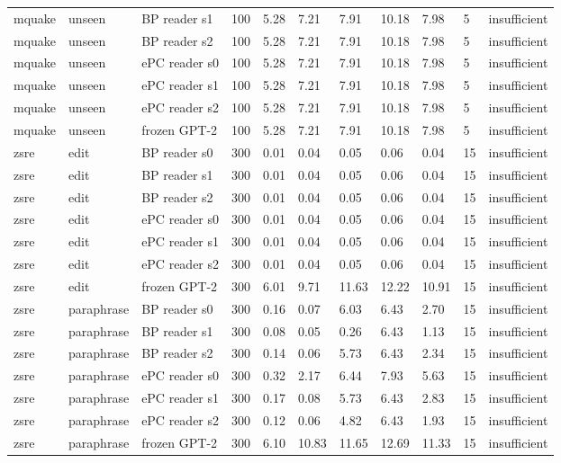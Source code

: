 \documentclass[10pt,a4paper]{article}
\begin{document}
\begin{center}
\begin{tabularx}{\textwidth}{@{}p{}XXXXXXXXXX@{}}
mquake & unseen & BP reader s1 & 100 & 5.28 & 7.21 & 7.91 & 10.18 & 7.98 & 5 & insufficient \\
mquake & unseen & BP reader s2 & 100 & 5.28 & 7.21 & 7.91 & 10.18 & 7.98 & 5 & insufficient \\
mquake & unseen & ePC reader s0 & 100 & 5.28 & 7.21 & 7.91 & 10.18 & 7.98 & 5 & insufficient \\
mquake & unseen & ePC reader s1 & 100 & 5.28 & 7.21 & 7.91 & 10.18 & 7.98 & 5 & insufficient \\
mquake & unseen & ePC reader s2 & 100 & 5.28 & 7.21 & 7.91 & 10.18 & 7.98 & 5 & insufficient \\
mquake & unseen & frozen GPT-2 & 100 & 5.28 & 7.21 & 7.91 & 10.18 & 7.98 & 5 & insufficient \\
zsre & edit & BP reader s0 & 300 & 0.01 & 0.04 & 0.05 & 0.06 & 0.04 & 15 & insufficient \\
zsre & edit & BP reader s1 & 300 & 0.01 & 0.04 & 0.05 & 0.06 & 0.04 & 15 & insufficient \\
zsre & edit & BP reader s2 & 300 & 0.01 & 0.04 & 0.05 & 0.06 & 0.04 & 15 & insufficient \\
zsre & edit & ePC reader s0 & 300 & 0.01 & 0.04 & 0.05 & 0.06 & 0.04 & 15 & insufficient \\
zsre & edit & ePC reader s1 & 300 & 0.01 & 0.04 & 0.05 & 0.06 & 0.04 & 15 & insufficient \\
zsre & edit & ePC reader s2 & 300 & 0.01 & 0.04 & 0.05 & 0.06 & 0.04 & 15 & insufficient \\
zsre & edit & frozen GPT-2 & 300 & 6.01 & 9.71 & 11.63 & 12.22 & 10.91 & 15 & insufficient \\
zsre & paraphrase & BP reader s0 & 300 & 0.16 & 0.07 & 6.03 & 6.43 & 2.70 & 15 & insufficient \\
zsre & paraphrase & BP reader s1 & 300 & 0.08 & 0.05 & 0.26 & 6.43 & 1.13 & 15 & insufficient \\
zsre & paraphrase & BP reader s2 & 300 & 0.14 & 0.06 & 5.73 & 6.43 & 2.34 & 15 & insufficient \\
zsre & paraphrase & ePC reader s0 & 300 & 0.32 & 2.17 & 6.44 & 7.93 & 5.63 & 15 & insufficient \\
zsre & paraphrase & ePC reader s1 & 300 & 0.17 & 0.08 & 5.73 & 6.43 & 2.83 & 15 & insufficient \\
zsre & paraphrase & ePC reader s2 & 300 & 0.12 & 0.06 & 4.82 & 6.43 & 1.93 & 15 & insufficient \\
zsre & paraphrase & frozen GPT-2 & 300 & 6.10 & 10.83 & 11.65 & 12.69 & 11.33 & 15 & insufficient \\

\end{tabularx}
\end{center}
\end{document}
